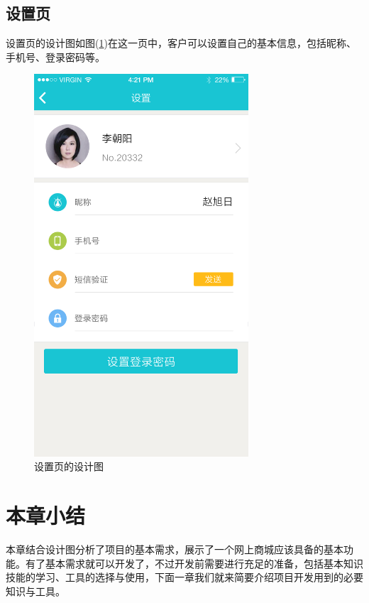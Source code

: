     \subsection{设置页}
      \label{subsec:设置页}
        设置页的设计图如图(\ref{fig:setting_dsn})在这一页中，客户可以设置自己的基本信息，包括昵称、手机号、登录密码等。
        \begin{figure}[htbp]
          \centering
          \includegraphics[width=8cm]{./img/setting_dsn.png}
          \caption{设置页的设计图}
          \label{fig:setting_dsn}
        \end{figure}

\clearpage
\section{本章小结}
  \label{sec:需求小结}
    本章结合设计图分析了项目的基本需求，展示了一个网上商城应该具备的基本功能。有了基本需求就可以开发了，不过开发前需要进行充足的准备，包括基本知识技能的学习、工具的选择与使用，下面一章我们就来简要介绍项目开发用到的必要知识与工具。

